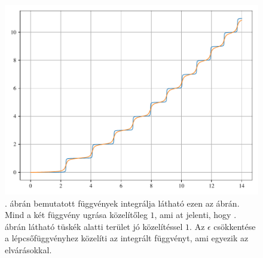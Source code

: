 \begin{figure}[H]
	\includegraphics[scale=1]{./figs/numberofstatesfromgreen.pdf}
	\caption[Állapotok száma]{. ábrán bemutatott függvények integrálja látható ezen az ábrán. Mind a két függvény ugrása közelítőleg $1$, ami at jelenti, hogy . ábrán látható tüskék alatti terület jó közelítéssel $1$. Az $\epsilon$ csökkentése a lépcsőfüggvényhez közelíti az integrált függvényt, ami egyezik az elvárásokkal.}
\end{figure}
